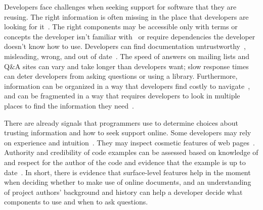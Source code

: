 
Developers face challenges when seeking support for software that they are reusing.
The right information is often missing in the place that developers are looking for it~\cite{robillard_field_2011,storey_revolution_2014,nykaza_what_2002}.
The right components may be accessible only with terms or concepts the developer isn't familiar with~\cite{nykaza_what_2002,jeong_improving_2009,robillard_field_2011} or require dependencies the developer doesn't know how to use.
Developers can find documentation untrustworthy~\cite{robillard_field_2011,storey_revolution_2014}, misleading, wrong, and out of date~\cite{nykaza_what_2002,lethbridge_how_2003,robillard_field_2011}.
The speed of answers on mailing lists and Q\&A sites can vary and take longer than developers want; slow response times can deter developers from asking questions or using a library.
Furthermore, information can be organized in a way that developers find costly to navigate~\cite{robillard_field_2011}, and can be fragmented in a way that requires developers to look in multiple places to find the information they need~\cite{jeong_improving_2009}.

There are already signals that programmers use to determine choices about trusting information and how to seek support online.
Some developers may rely on experience and intuition~\cite{storey_revolution_2014}.
They may inspect cosmetic features of web pages~\cite{brandt_two_2009}.
Authority and credibility of code examples can be assessed based on knowledge of and respect for the author of the code and evidence that the example is up to date~\cite{robillard_field_2011}.
In short, there is evidence that surface-level features help in the moment when deciding whether to make use of online documents, and an understanding of project authors' background and history can help a developer decide what components to use and when to ask questions.

\fi

